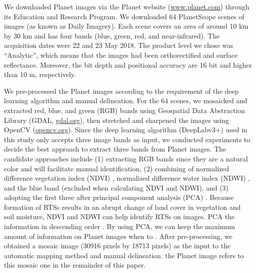 \documentclass[authoryear,preprint,review,12pt]{elsarticle}
\begin{document}
We downloaded Planet images via the Planet website (\url{www.planet.com}) through its Education and Research Program. We downloaded 64 PlanetScope scenes of images (as known as Daily Imagery). Each scene covers an area of around 10 km by 30 km and has four bands (blue, green, red, and near-infrared). The acquisition dates were 22 and 23 May 2018. The product level we chose was ``Analytic'', which means that the images had been orthorectified and  surface reflectance. Moreover, the bit depth and positional accuracy are 16 bit and higher than 10 m, respectively. %

We pre-processed the Planet images according to the requirement of the deep learning algorithm and manual delineation. For the 64 scenes, we mosaicked and extracted red, blue, and green (RGB) bands using Geospatial Data Abstraction Library (GDAL, \url{gdal.org}), then stretched and sharpened the images using OpenCV (\url{opencv.org}). Since the deep learning algorithm (DeepLabv3+) used in this study only accepts three image bands as input, we conducted experiments to decide the best approach to extract three bands from Planet images. The candidate approaches include (1) extracting RGB bands since they are a natural color and will facilitate manual identification, (2) combining of normalized difference vegetation index (NDVI) \citep{rouse1974monitoring}, normalized difference water index (NDWI) \citep{mcfeeters1996use}, and the blue band (excluded when calculating NDVI and NDWI), and (3) adopting the first three  after  principal component analysis (PCA) . Because formation of RTSs results in an abrupt change of land cover in vegetation and soil moisture,  NDVI and NDWI can help identify RTSs on images. PCA  the information in descending order \citep{wold1987principal}.  By using PCA, we can keep the maximum amount of information on Planet images when  to . 
 After pre-processing, we obtained a mosaic image (30916 pixels by 18713 pixels) as the input to the automatic mapping method and manual delineation.  the Planet image refers to this mosaic one in the remainder of this paper.
\end{document}
